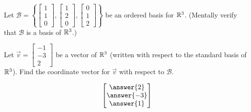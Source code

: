 \documentclass{ximera}
\author{Anna Davis}
\begin{document}
\begin{exercise}
Let $\mathcal{B}=\left\{ \begin{bmatrix}1\\1\\0\end{bmatrix}, \begin{bmatrix}1\\2\\0\end{bmatrix}, \begin{bmatrix}0\\1\\2\end{bmatrix}\right\}$ be an ordered basis for $\mathbb{R}^3$.  (Mentally verify that $\mathcal{B}$ is a basis of $\mathbb{R}^3$.)

Let $\vec{v}=\begin{bmatrix}-1\\-3\\2\end{bmatrix}$ be a vector of $\mathbb{R}^3$ (written with respect to the standard basis of $\mathbb{R}^3$).
Find the coordinate vector for $\vec{v}$ with respect to $\mathcal{B}$.

$$\begin{bmatrix}\answer{2}\\\answer{-3}\\\answer{1}\end{bmatrix}$$
\end{exercise}
\end{document}
